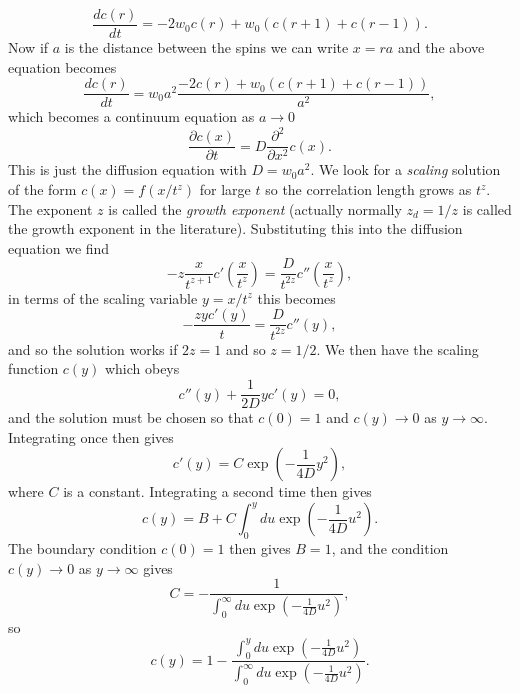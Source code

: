 \documentclass[11pt]{report}
\begin{document}
\begin{equation}
\frac{d c(r) }{dt}= -2w_0  c(r) + w_0(c(r+1) +c(r-1)).
\end{equation}
Now if $a$ is the distance between the spins we can write $x=ra$ and the above equation becomes
\begin{equation}
\frac{d c(r) }{dt}= w_0a^2\frac{ -2 c(r) + w_0(c(r+1) +c(r-1))}{a^2},
\end{equation}
which becomes a continuum equation as $a\to 0$
\begin{equation}
\frac{\partial c(x) }{\partial t}= D \frac{\partial^2}{\partial x^2}c(x).
\end{equation}
This is just the diffusion equation with $D= w_0a^2$. We look for a {\em scaling} solution of the form $c(x)= f(x/t^z)$ for large $t$ so the correlation length grows as $t^z$. The exponent $z$ is called the {\em growth exponent} (actually normally $z_d=1/z$ is called the growth exponent in the literature). Substituting this into the diffusion equation we find
\begin{equation}
-z\frac{x}{ t^{z+1}}c'(\frac{x}{t^z}) = \frac{D}{t^{2z}} c''(\frac{x}{t^z}),
\end{equation}
in terms of the scaling variable $y=x/t^z$ this becomes
\begin{equation}
-\frac{zy c'(y)}{t} = \frac{D}{t^{2z}} c''(y),
\end{equation}
and so the solution works if $2z=1$ and so $z=1/2$. We then have the scaling function $c(y)$ which obeys
\begin{equation}
c''(y) +\frac{1}{2D} yc'(y) = 0,
\end{equation}
and the solution must be chosen so that $c(0)=1$ and $c(y)\to 0$ as $y\to\infty$. Integrating once then gives
\begin{equation}
c'(y) = C\exp(-\frac{1}{4D}y^2),
\end{equation}
where $C$ is a constant. Integrating a second time then gives
\begin{equation}
c(y) = B+ C\int_{0}^y du \exp(-\frac{1}{4D}u^2).
\end{equation}
The boundary condition $c(0)=1$  then gives $B=1$, and the condition $c(y)\to 0$ as $y\to\infty$ gives
\begin{equation}
 C=-\frac{1}{\int_{0}^\infty du \exp(-\frac{1}{4D}u^2)},
\end{equation}
so
\begin{equation}
c(y) = 1- \frac{\int_{0}^y du \exp(-\frac{1}{4D}u^2)}{\int_{0}^\infty du \exp(-\frac{1}{4D}u^2)}.
\end{equation}
\end{document}
